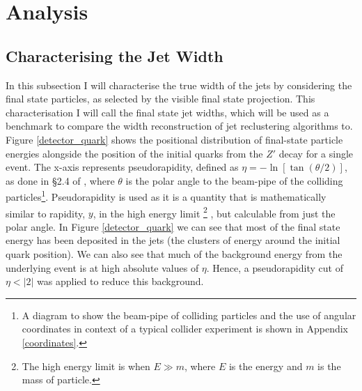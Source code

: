 \documentclass[a4paper,11pt, onecolumn]{article}
\begin{document}
\section{Analysis}
\subsection{Characterising the Jet Width} \label{ss fs}
  
  In this subsection I will characterise the true width of the jets by considering the final state particles, as selected by the visible final
  state projection. This characterisation I will call the final state jet widths, which will be used as a benchmark to compare the width reconstruction of
  jet reclustering algorithms to.
  Figure \ref{detector_quark} shows the positional distribution of final-state particle energies alongside the position of the
  initial quarks from the $Z'$ decay for a single event. The x-axis represents pseudorapidity, defined as 
  $\eta = -\ln\left[\tan\left(\theta /2 \right)\right]$, as done in \S2.4 of \cite{wong}, where $\theta$ is the polar angle to the beam-pipe of the colliding 
  particles\footnote{A diagram to show the beam-pipe of colliding particles and the use of angular coordinates in context 
  of a typical collider experiment is shown in Appendix \ref{coordinates}.}. Pseudorapidity is used as it is a
  quantity that is mathematically similar to rapidity, $y$, in the high energy limit
  \footnote{The high energy limit is when $E \gg m$, where $E$ is the energy and $m$ is the mass of particle.} \cite{pseudorapidity},
  but calculable from just the polar angle. In Figure \ref{detector_quark} 
  we can see that most of the final state energy has been deposited in the jets (the clusters of energy around the initial quark position). We can also see that much 
  of the background energy from the underlying event is at high absolute values of $\eta$. Hence, a pseudorapidity cut of $\eta < |2|$ was applied to reduce this background.
\end{document}
